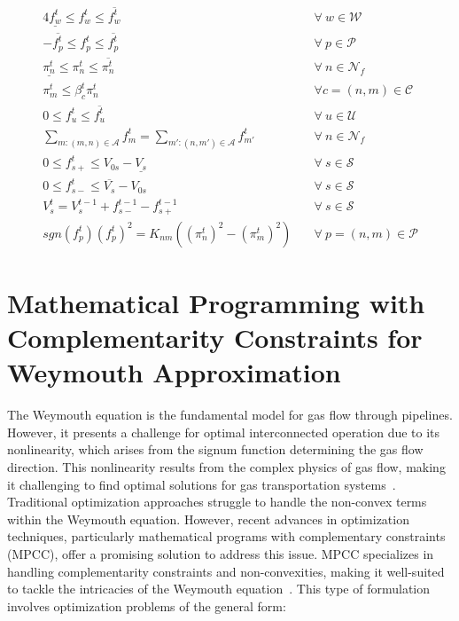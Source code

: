 \begin{alignat}{4}
    \underline{f_{w}^t} \leq f_{w}^t \leq \overline{f_{w}^t} &\quad \forall \ w \in \mathcal{W} \label{eq:well_limits} \\
    -\overline{f_{p}^t} \leq f_{p}^t \leq \overline{f_{p}^t} &\quad \forall \ p \in \mathcal{P} \label{eq:pipe_limits} \\
    \underline{\pi_{n}^t} \leq \pi_{n}^t \leq \overline{\pi_{n}^t} &\quad \forall \ n \in \mathcal{N}_f \label{eq:press_limit} \\
    \pi_{m}^t \leq \beta_{c}^t{\pi_{n}^t} &\quad \forall c=(n,m) \in \mathcal{C} \label{eq:comp_ratio} \\
    0 \leq f_{u}^{t} \leq \overline{f_{u}^{t}} &\quad \forall \ u \in \mathcal{U} \label{eq:dem_limit_gas} \\
    \sum_{m:(m,n)\in\mathcal{A}}{f_{m}^t} = \sum_{m':(n,m')\in\mathcal{A}}{f_{m'}^t} &\quad \forall \ n \in \mathcal{N}_f \label{eq:gas_balance} \\
    0 \leq f_{s+}^t \leq V_{0s} - \underline{V_s} &\quad \forall \ s \in \mathcal{S} \label{eq:sto_limit1} \\ 
    0 \leq f_{s-}^t \leq \overline{V_s} - V_{0s} &\quad \forall \ s \in \mathcal{S} \label{eq:sto_limit2} \\ 
    V_{s}^t = V_{s}^{t-1} + f_{s-}^{t-1} - f_{s+}^{t-1} &\quad \forall \ s \in \mathcal{S} \label{eq:sto_time}\\
    sgn(f_{p}^t)(f_{p}^t)^2 = K_{nm}((\pi_{n}^t)^2-(\pi_{m}^t)^2) &\quad \forall \ p =(n,m) \in\mathcal{P} \label{eq:weymouth_cons}
\end{alignat}


\section{Mathematical Programming with Complementarity Constraints for Weymouth Approximation} \label{sec:mpcc}

The Weymouth equation is the fundamental model for gas flow through pipelines. However, it presents a challenge for optimal interconnected operation due to its nonlinearity, which arises from the signum function determining the gas flow direction. This nonlinearity results from the complex physics of gas flow, making it challenging to find optimal solutions for gas transportation systems~\citep{weymouth_nonconvex}. Traditional optimization approaches struggle to handle the non-convex terms within the Weymouth equation. However, recent advances in optimization techniques, particularly mathematical programs with complementary constraints (MPCC), offer a promising solution to address this issue. MPCC specializes in handling complementarity constraints and non-convexities, making it well-suited to tackle the intricacies of the Weymouth equation~\citep{baumrucker_renfro_biegler_2008}. This type of formulation involves optimization problems of the general form:


